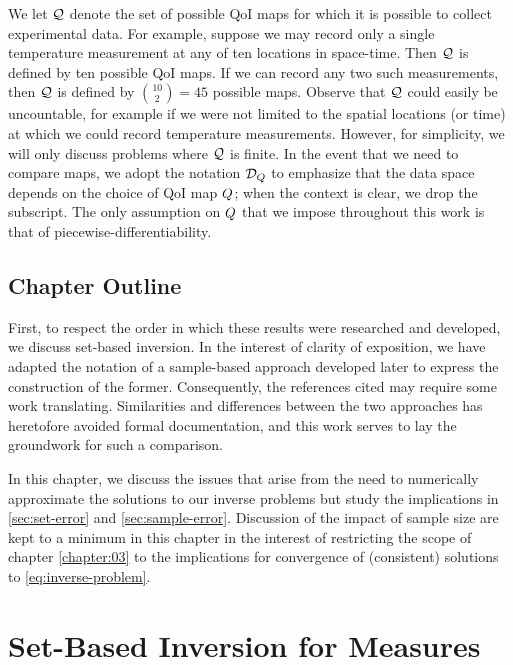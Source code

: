 We let $\mathcal{Q}$ denote the set of possible QoI maps for which it is possible to collect experimental data.
For example, suppose we may record only a single temperature measurement at any of ten locations in space-time.
Then $\mathcal{Q}$ is defined by ten possible QoI maps.
If we can record any two such measurements, then $\mathcal{Q}$ is defined by $\binom{10}{2} = 45$ possible maps.
Observe that $\mathcal{Q}$ could easily be uncountable, for example if we were not limited to the spatial locations (or time) at which we could record temperature measurements.
However, for simplicity, we will only discuss problems where $\mathcal{Q}$ is finite.
In the event that we need to compare maps, we adopt the notation $\mathcal{D}_{Q}$ to emphasize that the data space depends on the choice of QoI map $Q$; when the context is clear, we drop the subscript.
The only assumption on $Q$ that we impose throughout this work is that of piecewise-differentiability.

\subsection{Chapter Outline}
First, to respect the order in which these results were researched and developed, we discuss set-based inversion.
In the interest of clarity of exposition, we have adapted the notation of a sample-based approach developed later to express the construction of the former.
Consequently, the references cited may require some work translating. Similarities and differences between the two approaches has heretofore avoided formal documentation, and this work serves to lay the groundwork for such a comparison. 

In this chapter, we discuss the issues that arise from the need to numerically approximate the solutions to our inverse problems but study the implications in \ref{sec:set-error} and \ref{sec:sample-error}.
Discussion of the impact of sample size are kept to a minimum in this chapter in the interest of restricting the scope of chapter \ref{chapter:03} to the implications for convergence of (consistent) solutions to \eqref{eq:inverse-problem}.

\pagebreak
\section{Set-Based Inversion for Measures}\label{sec:ch02-set}






